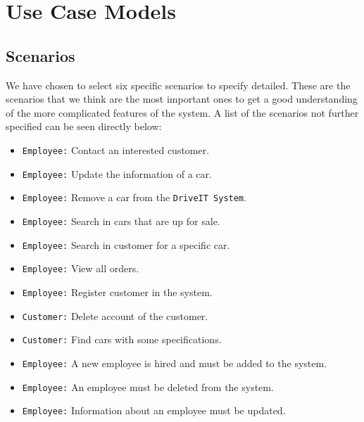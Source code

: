 \section{Use Case Models}

\subsection{Scenarios}
We have chosen to select six specific scenarios to specify detailed. These are the scenarios that we think are the most important ones to get a good understanding of the more complicated features of the system. A list of the scenarios not further specified can be seen directly below:

\begin{itemize}
    \item \texttt{Employee:} Contact an interested customer.
    \item \texttt{Employee:} Update the information of a car.
    \item \texttt{Employee:} Remove a car from the \texttt{DriveIT System}.
    \item \texttt{Employee:} Search in cars that are up for sale.
    \item \texttt{Employee:} Search in customer for a specific car.
    \item \texttt{Employee:} View all orders.
    \item \texttt{Employee:} Register customer in the system.
    \item \texttt{Customer:} Delete account of the customer.
    \item \texttt{Customer:} Find cars with some specifications.
    \item \texttt{Employee:} A new employee is hired and must be added to the system.
    \item \texttt{Employee:} An employee must be deleted from the system.
    \item \texttt{Employee:} Information about an employee must be updated.
\end{itemize}













